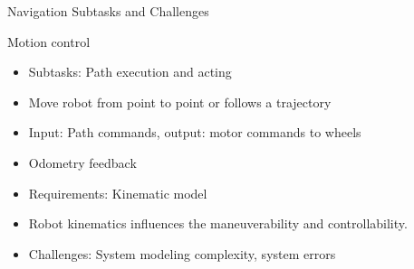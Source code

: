 \begin{frame}{Navigation Subtasks and Challenges}

\begin{block}{Motion control}
    \begin{itemize}
    		\item Subtasks: Path execution and acting
		\item Move robot from point to point or follows a trajectory
    		\item Input: Path commands, output: motor commands to wheels
    		\item Odometry feedback
    		\item Requirements: Kinematic model
    		\item Robot kinematics influences the maneuverability and controllability.
    		\item \alert{Challenges: System modeling complexity, system errors}
    \end{itemize}
\end{block}

\end{frame}